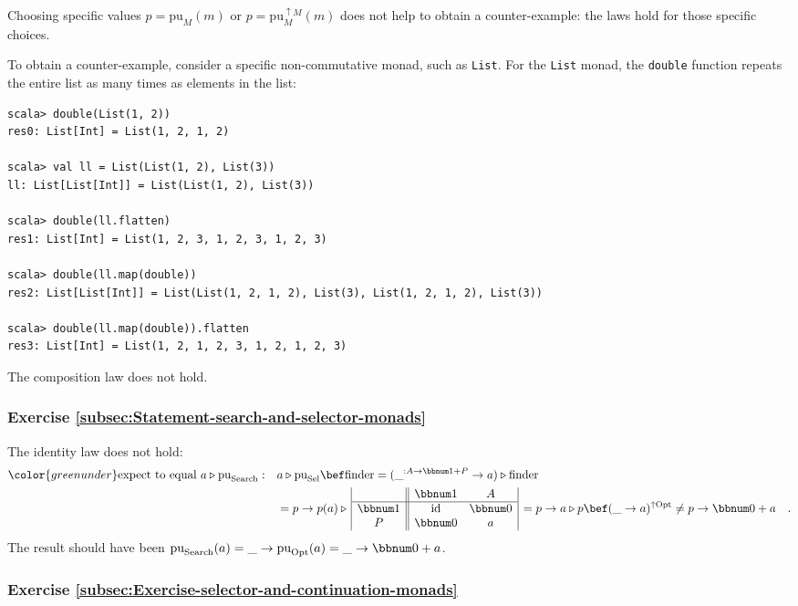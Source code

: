 Choosing specific values $p=\text{pu}_{M}(m)$ or $p=\text{pu}_{M}^{\uparrow M}(m)$
does not help to obtain a counter-example: the laws hold for those
specific choices.

To obtain a counter-example, consider a specific non-commutative monad,
such as \lstinline!List!. For the \lstinline!List! monad, the \lstinline!double!
function repeats the entire list as many times as elements in the
list:
\begin{lstlisting}
scala> double(List(1, 2))
res0: List[Int] = List(1, 2, 1, 2)

scala> val ll = List(List(1, 2), List(3))
ll: List[List[Int]] = List(List(1, 2), List(3))

scala> double(ll.flatten)
res1: List[Int] = List(1, 2, 3, 1, 2, 3, 1, 2, 3)

scala> double(ll.map(double))
res2: List[List[Int]] = List(List(1, 2, 1, 2), List(3), List(1, 2, 1, 2), List(3)) 

scala> double(ll.map(double)).flatten
res3: List[Int] = List(1, 2, 1, 2, 3, 1, 2, 1, 2, 3)
\end{lstlisting}
The composition law does not hold.

\subsubsection*{Exercise \ref{subsec:Statement-search-and-selector-monads}}

The identity law does not hold:
\begin{align*}
{\color{greenunder}\text{expect to equal }a\triangleright\text{pu}_{\text{Search}}:}\quad & a\triangleright\text{pu}_{\text{Sel}}\bef\text{finder}=(\_^{:A\rightarrow\bbnum 1+P}\rightarrow a)\triangleright\text{finder}\\
 & =p\rightarrow p(a)\triangleright\,\begin{array}{|c||cc|}
 & \bbnum 1 & A\\
\hline \bbnum 1 & \text{id} & \bbnum 0\\
P & \bbnum 0 & a
\end{array}\,=p\rightarrow a\triangleright p\bef(\_\rightarrow a)^{\uparrow\text{Opt}}\neq p\rightarrow\bbnum 0+a\quad.
\end{align*}
The result should have been $\text{pu}_{\text{Search}}(a)=\_\rightarrow\text{pu}_{\text{Opt}}(a)=\_\rightarrow\bbnum 0+a$.

\subsubsection*{Exercise \ref{subsec:Exercise-selector-and-continuation-monads}}

